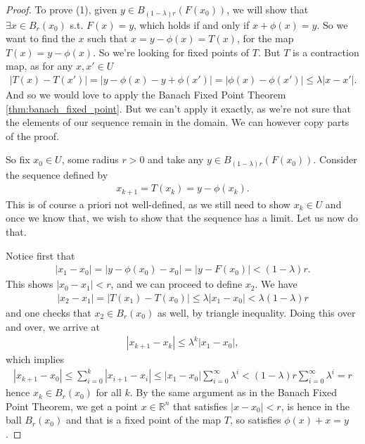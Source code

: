 \begin{proof}
	To prove (1), given $y \in B_{(1-\lambda)r}(F(x_{0}))$, we will show that $\exists x \in B_{r}(x_{0})$ s.t. $F(x) = y$, which holds if and only if $x + \phi(x) = y$. So we want to find the $x$ such that $x = y - \phi(x) = T(x)$, for the map $T(x) = y - \phi(x)$. So we're looking for fixed points of $T$. But $T$ is a contraction map, as for any $x, x' \in U$
	\begin{align*}
		\left| T(x) - T(x') \right| = \left| y - \phi(x) - y + \phi(x') \right| = \left| \phi(x) - \phi(x') \right| \leq \lambda \left| x - x' \right|.
	\end{align*}
    And so we would love to apply the Banach Fixed Point Theorem \ref{thm:banach_fixed_point}. But we can't apply it exactly, as we're not sure that the elements of our sequence remain in the domain. We can however copy parts of the proof. 

    So fix $x_{0} \in U$, some radius $r > 0$ and take any $y \in B_{(1-\lambda)r}(F(x_{0}))$. Consider the sequence defined by
    \begin{align*}
        x_{k+1} = T(x_{k}) = y - \phi(x_{k}).
    \end{align*}
    This is of course a priori not well-defined, as we still need to show $x_{k} \in U$ and once we know that, we wish to show that the sequence has a limit. Let us now do that.

    Notice first that 
    \begin{align*}
        \left| x_{1} - x_{0} \right| = \left| y - \phi(x_{0})  - x_{0} \right| = \left| y - F(x_{0}) \right| < (1-\lambda)r.
    \end{align*}
    This shows $\left| x_{0} - x_{1} \right| < r$, and we can proceed to define $x_{2}$. We have 
    \begin{align*}
        \left| x_{2} - x_{1} \right| = \left| T(x_{1}) - T(x_{0}) \right| \leq \lambda\left| x_{1} - x_{0} \right| < \lambda(1 - \lambda)r
    \end{align*}
    and one checks that $x_{2} \in B_{r}(x_{0})$ as well, by triangle inequality. Doing this over and over, we arrive at
    \begin{align*}
        \left| x_{k+1} - x_{k} \right| \leq \lambda^{k} \left| x_{1} - x_{0} \right|,
    \end{align*}
    which implies
    \begin{align*}
        \left| x_{k+1} - x_{0} \right| \leq \sum_{i=0}^{k}  \left| x_{i+1} - x_{i} \right| \leq \left| x_{1} - x_{0} \right| \sum_{i=0}^{\infty}\lambda^{i} < (1-\lambda) r \sum_{i=0}^{\infty}\lambda^{i} = r
    \end{align*}
    hence $x_{k} \in B_{r}(x_{0})$ for all $k$. By the same argument as in the Banach Fixed Point Theorem, we get a point $x \in \mathbb{R}^{n}$ that satisfies $\left| x - x_{0} \right| < r$, is hence in the ball $B_{r}(x_{0})$ and that is a fixed point of the map $T$, so satisfies $\phi(x) + x = y$. 


\end{proof}
